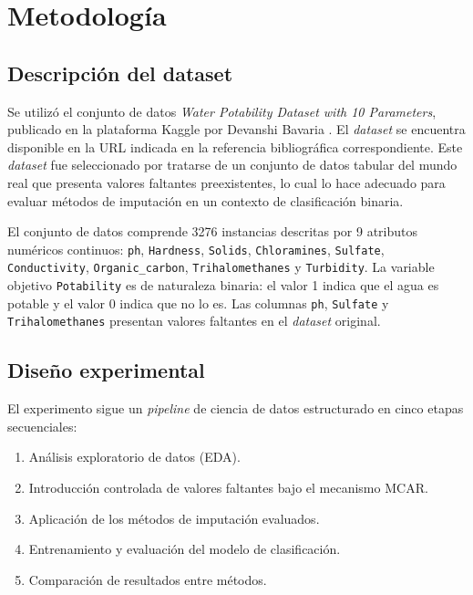 \chapter{Metodología}

\section{Descripción del dataset}

Se utilizó el conjunto de datos \textit{Water Potability Dataset with 10 Parameters},
publicado en la plataforma Kaggle por Devanshi Bavaria
\parencite{kaggle2021}. El \textit{dataset} se encuentra disponible en la URL
indicada en la referencia bibliográfica correspondiente. Este \textit{dataset} fue
seleccionado por tratarse de un conjunto de datos tabular del mundo real
que presenta valores faltantes preexistentes, lo cual lo hace adecuado
para evaluar métodos de imputación en un contexto de clasificación binaria.

El conjunto de datos comprende 3276 instancias descritas por 9 atributos
numéricos continuos: \texttt{ph},  \texttt{Hardness},  \texttt{Solids}, 
\texttt{Chloramines},  \texttt{Sulfate},  \texttt{Conductivity}, 
\texttt{Organic\_carbon},  \texttt{Trihalomethanes}  y  \texttt{Turbidity}.
La variable objetivo \texttt{Potability} es de naturaleza binaria: el valor
1 indica que el agua es potable y el valor 0 indica que no lo es. Las
columnas \texttt{ph}, \texttt{Sulfate} y \texttt{Trihalomethanes} presentan
valores faltantes en el \textit{dataset} original.

\section{Diseño experimental}

El experimento sigue un \textit{pipeline} de ciencia de datos estructurado en cinco
etapas secuenciales:

\begin{enumerate}
    \item Análisis exploratorio de datos (EDA).
    \item Introducción controlada de valores faltantes bajo el mecanismo MCAR.
    \item Aplicación de los métodos de imputación evaluados.
    \item Entrenamiento y evaluación del modelo de clasificación.
    \item Comparación de resultados entre métodos.
\end{enumerate}

